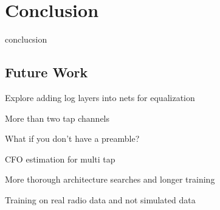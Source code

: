 \chapter{Conclusion}

conclucsion


\section{Future Work}

Explore adding log layers into nets for equalization

More than two tap channels

What if you don't have a preamble?

CFO estimation for multi tap

More thorough architecture searches and longer training

Training on real radio data and not simulated data